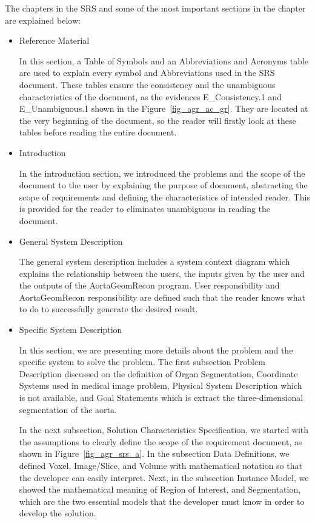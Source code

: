 The chapters in the SRS and some of the most important sections in the chapter are explained below:
\begin{itemize}
\item Reference Material

In this section, a Table of Symbols and an Abbreviations and Acronyms table are used to explain every symbol and Abbreviations used in the SRS document. These tables ensure the consistency and the unambiguous characteristics of the document, as the evidences E\_Consistency.1 and E\_Unambiguous.1 shown in the Figure~\ref{fig_agr_ac_gr}. They are located at the very beginning of the document, so the reader will firstly look at these tables before reading the entire document. 

\item Introduction

In the introduction section, we introduced the problems and the scope of the document to the user by explaining the purpose of document, abstracting the scope of requirements and defining the characteristics of intended reader. This is provided for the reader to eliminates unambiguous in reading the document.

\item General System Description

The general system description includes a system context diagram which explains the relationship between the users, the inputs given by the user and the outputs of the AortaGeomRecon program. User responsibility and AortaGeomRecon responsibility are defined such that the reader knows what to do to successfully generate the desired result. 

\item Specific System Description

In this section, we are presenting more details about the problem and the specific system to solve the problem. The first subsection Problem Description discussed on the definition of Organ Segmentation, Coordinate Systems used in medical image problem, Physical System Description which is not available, and Goal Statements which is extract the three-dimensional segmentation of the aorta.

In the next subsection, Solution Characteristics Specification, we started with the assumptions to clearly define the scope of the requirement document, as shown in Figure~\ref{fig_agr_srs_a}. In the subsection Data Definitions, we defined Voxel, Image/Slice, and Volume with mathematical notation so that the developer can easily interpret. Next, in the subsection Instance Model, we showed the mathematical meaning of Region of Interest, and Segmentation, which are the two essential models that the developer must know in order to develop the solution.


\end{itemize}
